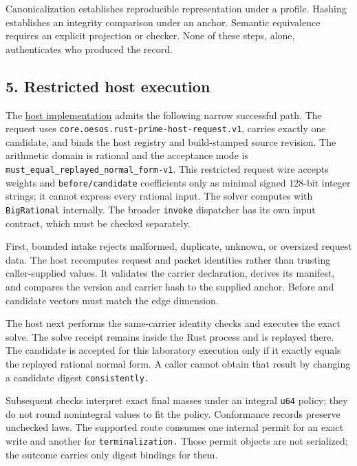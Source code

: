 \documentclass[
  11pt,
]{article}
\newcommand{\passthrough}[1]{#1}
\begin{document}
Canonicalization establishes reproducible representation under a
profile. Hashing establishes an integrity comparison under an anchor.
Semantic equivalence requires an explicit projection or checker. None of
these steps, alone, authenticates who produced the record.

\subsection{5. Restricted host
execution}\label{restricted-host-execution}

The
\href{https://github.com/dbccpage/the_symbol_game/blob/52cb5457f6c485ba548cfd292f6012a941ed22cf/engine/crates_rs/core_symbol_game/src/host.rs}{host
implementation} admits the following narrow successful path. The request
uses \nolinkurl{core.oesos.rust-prime-host-request.v1}, carries exactly
one candidate, and binds the host registry and build-stamped source
revision. The arithmetic domain is rational and the acceptance mode is
\nolinkurl{must_equal_replayed_normal_form-v1}. This restricted request
wire accepts weights and \nolinkurl{before/candidate} coefficients only
as minimal signed 128-bit integer strings; it cannot express every
rational input. The solver computes with
\passthrough{\lstinline!BigRational!} internally. The broader
\passthrough{\lstinline!invoke!} dispatcher has its own input contract,
which must be checked separately.

First, bounded intake rejects malformed, duplicate, unknown, or
oversized request data. The host recomputes request and packet
identities rather than trusting caller-supplied values. It validates the
carrier declaration, derives its manifest, and compares the version and
carrier hash to the supplied anchor. Before and candidate vectors must
match the edge dimension.

The host next performs the same-carrier identity checks and executes the
exact solve. The solve receipt remains inside the Rust process and is
replayed there. The candidate is accepted for this laboratory execution
only if it exactly equals the replayed rational normal form. A caller
cannot obtain that result by changing a candidate digest
\nolinkurl{consistently.}

Subsequent checks interpret exact final masses under an integral
\passthrough{\lstinline!u64!} policy; they do not round nonintegral
values to fit the policy. Conformance records preserve unchecked laws.
The supported route consumes one internal permit for an exact write and
another for \nolinkurl{terminalization.} Those permit objects are not
serialized; the outcome carries only digest bindings for them.
\end{document}
